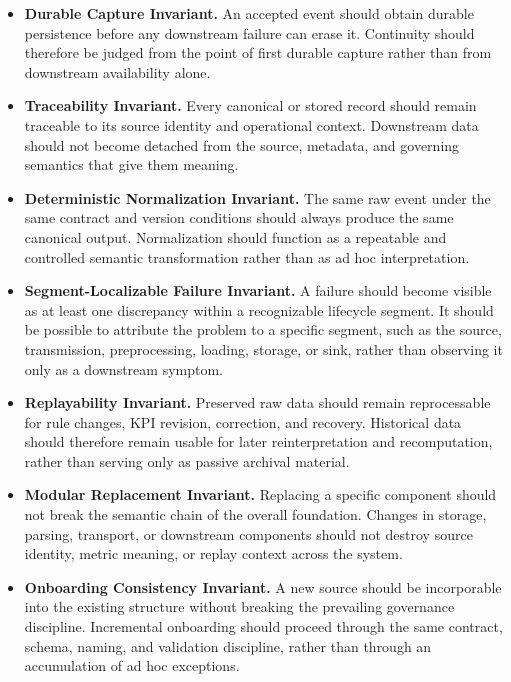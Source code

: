 \documentclass[systems,article,submit,pdftex,moreauthors]{Definitions/mdpi}
\begin{document}
\begin{itemize}
    \item[\textbf{I1.}] \textbf{Durable Capture Invariant.} An accepted event should obtain durable persistence before any downstream failure can erase it. Continuity should therefore be judged from the point of first durable capture rather than from downstream availability alone.

    \item[\textbf{I2.}] \textbf{Traceability Invariant.} Every canonical or stored record should remain traceable to its source identity and operational context. Downstream data should not become detached from the source, metadata, and governing semantics that give them meaning.

    \item[\textbf{I3.}] \textbf{Deterministic Normalization Invariant.} The same raw event under the same contract and version conditions should always produce the same canonical output. Normalization should function as a repeatable and controlled semantic transformation rather than as ad hoc interpretation.

    \item[\textbf{I4.}] \textbf{Segment-Localizable Failure Invariant.} A failure should become visible as at least one discrepancy within a recognizable lifecycle segment. It should be possible to attribute the problem to a specific segment, such as the source, transmission, preprocessing, loading, storage, or sink, rather than observing it only as a downstream symptom.

    \item[\textbf{I5.}] \textbf{Replayability Invariant.} Preserved raw data should remain reprocessable for rule changes, KPI revision, correction, and recovery. Historical data should therefore remain usable for later reinterpretation and recomputation, rather than serving only as passive archival material.

    \item[\textbf{I6.}] \textbf{Modular Replacement Invariant.} Replacing a specific component should not break the semantic chain of the overall foundation. Changes in storage, parsing, transport, or downstream components should not destroy source identity, metric meaning, or replay context across the system.

    \item[\textbf{I7.}] \textbf{Onboarding Consistency Invariant.} A new source should be incorporable into the existing structure without breaking the prevailing governance discipline. Incremental onboarding should proceed through the same contract, schema, naming, and validation discipline, rather than through an accumulation of ad hoc exceptions.
\end{itemize}
\end{document}
